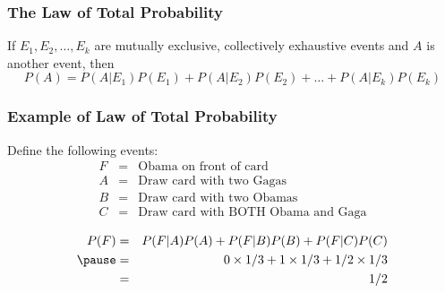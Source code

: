 \documentclass{beamer}
\begin{document}
\begin{frame}
\frametitle{The Law of Total Probability}
If $E_1, E_2, \hdots, E_k$ are mutually exclusive, collectively exhaustive events and $A$ is another event, then
	$$P(A) = P(A|E_1)P(E_1) + P(A|E_2)P(E_2) + \hdots + P(A|E_k)P(E_k)$$

\end{frame}
\begin{frame}
  \frametitle{Example of Law of Total Probability}
  Define the following events:
  \begin{eqnarray*}
    F &=&  \mbox{Obama on front of card}\\
    A &=&  \mbox{Draw card with two Gagas}\\
    B &=&  \mbox{Draw card with two Obamas}\\
    C &=&  \mbox{Draw card with BOTH Obama and Gaga}\\
  \end{eqnarray*}
  \begin{eqnarray*}
  P(F) &=& P(F|A)P(A) + P(F|B)P(B) + P(F|C)P(C) \\ \pause
  &=& 0 \times 1/3 + 1 \times 1/3 + 1/2 \times 1/3 \\
  &=& 1/2
  \end{eqnarray*}

\end{frame}
\def\EventA{(-0.35,0) circle (1.2)}
\def\EventB{(1.35,0) circle (1.2)}
\def\EventC{(-0.35,0) circle (0.6)}
\def\EventD{(0,0) circle (1.6)}
\def\SampleSpace{(-2,-2) rectangle (3,2)}
\end{document}
